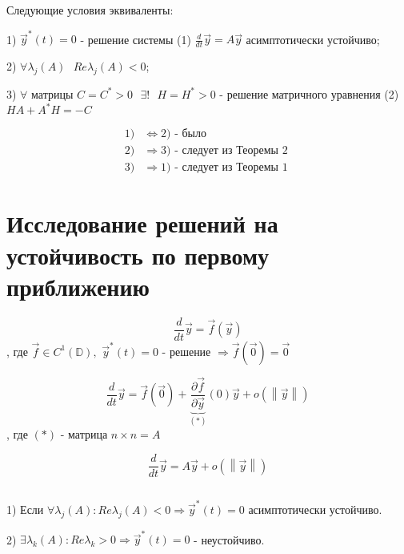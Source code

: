\documentclass[12pt, a4paper]{report}
\begin{document}
\begin{theorem}
    Следующие условия эквиваленты: 
    
    1) \( \vec{ y } ^* (t ) = 0  \) - решение системы (1) \( \displaystyle  \frac{d}{dt }  \vec{ y}  = A \vec{ y}   \) асимптотически устойчиво; 

    2) \( \forall  \lambda_j (A ) \text{ }  Re \lambda_j (A )< 0  \); 

    3) \( \forall   \) матрицы \( C = C^* >0 \text{ }  \exists  ! \text{ }  H = H^* > 0  \) - решение матричного уравнения (2) \( HA + A^* H = - C  \) 

    \[ \begin{aligned}
    1) & \Leftrightarrow 2) \text{ - было } \\
    2) &\Rightarrow  3) \text{ - следует из Теоремы 2 } \\
    3) &\Rightarrow 1) \text{ - следует из Теоремы 1} 
    \end{aligned} \] 
\end{theorem}

\section{Исследование решений на устойчивость по первому приближению}

\[ \frac{d}{dt }  \vec{ y}  = \vec{ f }  (\vec{ y} ) \] 
, где \( \vec{ f }  \in  C ^1 (\mathbb{D} ) ,\) \( \vec{  y} ^{* }  (t ) = 0  \) - решение \( \Rightarrow   \vec{ f }  (\vec{ 0 } ) = \vec{0 } \) 

\[ \frac{d}{dt }  \vec{ y}  = \vec{ f }  (\vec{ 0}  ) + \underbrace{\frac{ \partial  \vec{ f } }{\partial  \vec{ y}  } }_{(*)}(0 ) \vec{ y } + o(\left\lVert \vec{ y}  \right\rVert)   \] 
, где \( (*) \) - матрица \( n \times  n  = A  \) 

\[ \frac{d}{dt } \vec{ y}  = A \vec{ y}  + o (\left\lVert  \vec{ y }  \right\rVert) \] 

\begin{theorem} \(  \) 

    1) Если \( \forall  \lambda_j (A ): Re \lambda_j (A ) < 0 \Rightarrow \vec{ y} ^* (t ) = 0  \)  асимптотически устойчиво. 

    2) \( \exists  \lambda_k (A ) : Re \lambda_k >0 \Rightarrow \vec{ y } ^* (t ) = 0  \) - неустойчиво.
\end{theorem}


\ifdefined\mainfile
\else
    
\end{document}
